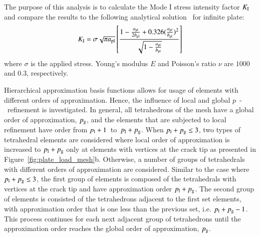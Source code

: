 \documentclass[11pt]{acmeArticle}
\numberwithin{equation}{section}
\begin{document}
The purpose of this analysis is to calculate the Mode I stress intensity factor $ K_{\rm I} $ and compare the results to the following analytical solution~\citep{rooke1976compendium} for infinite plate:
\begin{equation}\label{eq:frac_analytical}
K_{\rm I}=\sigma \sqrt{\pi a_{\rm {pl}}} \left[  \frac{1 - \frac{a_{\rm {pl}}}{2b_{\rm {pl}}} + 0.326 (\frac{a_{\rm {pl}}}{b_{\rm {pl}}})^2 }{\sqrt{1-\frac{a_{\rm {pl}}}{b_{\rm {pl}}}}}  \right]
\end{equation}
where $\sigma $ is the applied stress. 
Young's modulus $E$ and Poisson's ratio $\nu$ are $1000$ and $0.3$, respectively. 


Hierarchical approximation basis functions allows for usage of elements with different orders of approximation. 
Hence, the influence of local and global $p$~-~refinement is investigated.
In general, all tetrahedrons of the mesh have a global order of approximation, $p_{\rm g}$, and the elements that are subjected to local refinement have order from $p_{\rm{l}} + 1$~to~$p_{\rm{l}} + p_{\rm{g}}$.
When $p_{\rm l}+p_{\rm g}\leq3$, two types of tetrahedral elements are considered where local order of approximation is increased to $p_{\rm l}+p_{\rm g}$ only at elements with vertices at the crack tip as presented in Figure~\ref{fig:plate_load_mesh}b.
Otherwise, a number of groups of tetrahedrals with different orders of approximation are considered.
Similar to the case where $p_{\rm l} + p_{\rm g} \leq 3$, the first group of elements is composed of the tetrahedrals with vertices at the crack tip and have approximation order $p_{\rm l}+p_{\rm g}$.
The second group of elements is consisted of the tetrahedrons adjacent to the first set elements, with approximation order that is one less than the previous set, i.e. $p_{\rm l}+p_{\rm g}-1$.
This process continues for each next adjacent group of tetrahedrons until the approximation order reaches the global order of approximation, $p_{\rm {g}}$.
\end{document}

